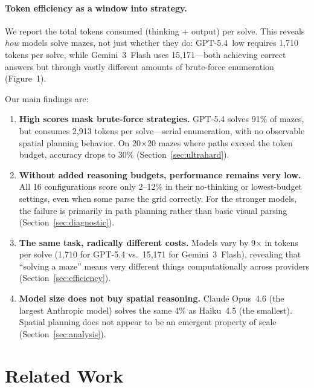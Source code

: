 \documentclass[11pt]{article}
\begin{document}
\paragraph{Token efficiency as a window into strategy.}
We report the total tokens consumed (thinking + output) per solve.
This reveals \emph{how} models solve mazes, not just whether they do: GPT-5.4~low requires 1,710 tokens per solve, while Gemini~3~Flash uses 15,171---both achieving correct answers but through vastly different amounts of brute-force enumeration (Figure~1).

Our main findings are:

\begin{enumerate}
\itemsep0em
\item \textbf{High scores mask brute-force strategies.} GPT-5.4 solves 91\% of mazes, but consumes 2,913 tokens per solve---serial enumeration, with no observable spatial planning behavior. On 20$\times$20 mazes where paths exceed the token budget, accuracy drops to 30\% (Section~\ref{sec:ultrahard}).

\item \textbf{Without added reasoning budgets, performance remains very low.} All 16 configurations score only 2--12\% in their no-thinking or lowest-budget settings, even when some parse the grid correctly. For the stronger models, the failure is primarily in path planning rather than basic visual parsing (Section~\ref{sec:diagnostic}).

\item \textbf{The same task, radically different costs.} Models vary by 9$\times$ in tokens per solve (1,710 for GPT-5.4 vs.\ 15,171 for Gemini~3~Flash), revealing that ``solving a maze'' means very different things computationally across providers (Section~\ref{sec:efficiency}).

\item \textbf{Model size does not buy spatial reasoning.} Claude Opus~4.6 (the largest Anthropic model) solves the same 4\% as Haiku~4.5 (the smallest). Spatial planning does not appear to be an emergent property of scale (Section~\ref{sec:analysis}).
\end{enumerate}

\section{Related Work}
\end{document}
